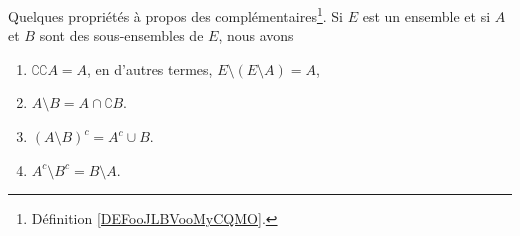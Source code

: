 \begin{lemma}       \label{LemPropsComplement}
	Quelques propriétés à propos des complémentaires\footnote{Définition \ref{DEFooJLBVooMyCQMO}.}. Si \( E\) est un ensemble et si \( A\) et \( B\) sont des sous-ensembles de \( E\), nous avons
	\begin{enumerate}
		\item			\label{ITEMooWIYBooKMLVnZ}
		      \( \complement \complement A =A\), en d'autres termes, \( E\setminus(E\setminus A)=A\),
		\item       \label{ItemLemPropComplementiii}
		      \( A\setminus B=A\cap\complement B\).
		\item       \label{ITEMooNHDUooWtURqQ}
		      \( (A\setminus B)^c=A^c\cup B\).
		\item       \label{ITEMooTBWKooTChOmC}
		      \( A^c\setminus B^c=B\setminus A\).
	\end{enumerate}
\end{lemma}

